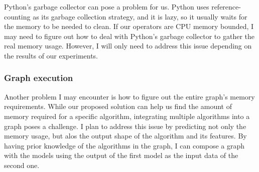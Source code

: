 Python's garbage collector can pose a problem for us.
Python uses reference-counting as its garbage collection strategy, and it is lazy, so it usually waits for the memory to be needed to clean.
If our operators are \ac{CPU} memory bounded, I may need to figure out how to deal with Python's garbage collector to gather the real memory usage.
However, I will only need to address this issue depending on the results of our experiments.

\subsubsection{Graph execution}

Another problem I may encounter is how to figure out the entire graph's memory requirements.
While our proposed solution can help us find the amount of memory required for a specific algorithm, integrating multiple algorithms into a graph poses a challenge.
I plan to address this issue by predicting not only the memory usage, but alos the output shape of the algorithm and its features.
By having prior knowledge of the algorithms in the graph, I can compose a graph with the models using the output of the first model as the input data of the second one.
